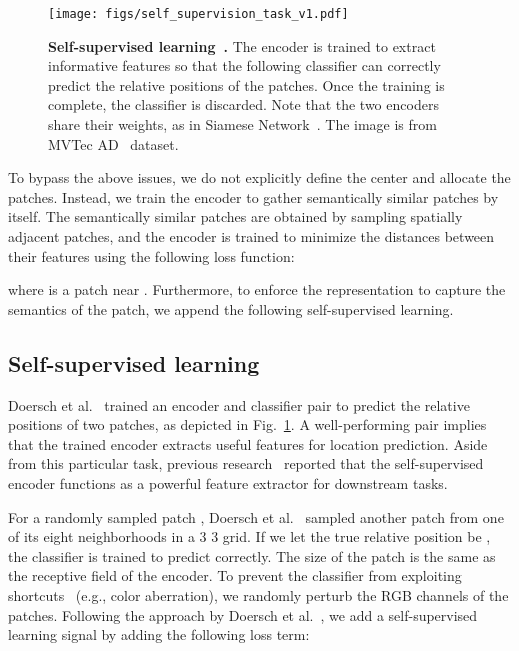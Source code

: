\documentclass[runningheads]{llncs}
\begin{document}
\begin{figure}[t]
    \centering
    \texttt{[image: figs/self\_supervision\_task\_v1.pdf]}
    \caption{\textbf{Self-supervised learning~\cite{patch_location}.} The encoder is trained to extract informative features so that the following classifier can correctly predict the relative positions of the patches. Once the training is complete, the classifier is discarded. Note that the two encoders share their weights, as in Siamese Network~\cite{siamese}. The image is from MVTec AD~\cite{mvtecad} dataset.}
    \label{fig:self_supervision}
    \vspace{-0.5em}
\end{figure} 
To bypass the above issues, we do not explicitly define the center and allocate the patches.
Instead, we train the encoder to gather semantically similar patches by itself.
The semantically similar patches are obtained by sampling spatially adjacent patches, and the encoder is trained to minimize the distances between their features using the following loss function:


where  is a patch near .
Furthermore, to enforce the representation to capture the semantics of the patch, we append the following self-supervised learning.

\subsection{Self-supervised learning} \label{sec:self_supervised}
Doersch et al.~\cite{patch_location} trained an encoder and classifier pair to predict the relative positions of two patches, as depicted in Fig.~\ref{fig:self_supervision}.
A well-performing pair implies that the trained encoder extracts useful features for location prediction.
Aside from this particular task, previous research~\cite{jigsaw,rotation,revisit_ssl} reported that the self-supervised encoder functions as a powerful feature extractor for downstream tasks.

For a randomly sampled patch , Doersch et al.~\cite{patch_location} sampled another patch  from one of its eight neighborhoods in a 3  3 grid.
If we let the true relative position be , the classifier  is trained to predict  correctly.
The size of the patch is the same as the receptive field of the encoder.
To prevent the classifier from exploiting shortcuts~\cite{lens} (e.g., color aberration), we randomly perturb the RGB channels of the patches.
Following the approach by Doersch et al.~\cite{patch_location}, we add a self-supervised learning signal by adding the following loss term:
\end{document}
